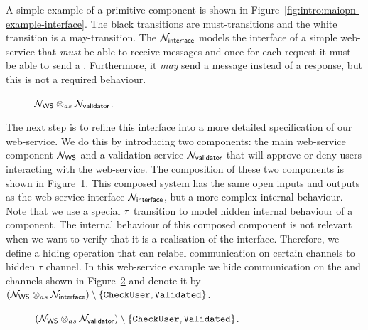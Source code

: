 A simple example of a primitive \MAIOPN component is shown in Figure~\ref{fig:intro:maiopn-example-interface}. The black transitions are must-transitions and the white transition is a may-transition. The \MAIOPN $\mathcal{N}_{\mathsf{interface}}$ models the interface of a simple web-service that \emph{must} be able to receive  messages and once for each request it must be able to send a . Furthermore, it \emph{may} send a  message instead of a response, but this is not a required behaviour. 

\begin{figure}[ht]
\centering
    
    \caption{$\mathcal{N}_{\mathsf{WS}} \otimes_{as} \mathcal{N}_{\mathsf{validator}} $.\label{fig:intro:maiopn-example-ws-composed}}
\end{figure}

The next step is to refine this interface into a more detailed specification of our web-service. We do this by introducing two components: the main web-service component $\mathcal{N}_{\mathsf{WS}}$ and a validation service $\mathcal{N}_{\mathsf{validator}}$ that will approve or deny users interacting with the web-service. The composition of these two components is shown in Figure~\ref{fig:intro:maiopn-example-ws-composed}. This composed system has the same open inputs and outputs as the web-service interface $\mathcal{N}_{\mathsf{interface}}$, but a more complex internal behaviour. Note that we use a special $\mathtt{\tau}$ transition to model hidden internal behaviour of a component. 
The internal behaviour of this composed component is not relevant when we want to verify that it is a realisation of the interface. Therefore, we define a hiding operation that can relabel communication on certain channels to hidden $\tau$ channel. In this web-service example we hide communication on the  and  channels shown in Figure~\ref{fig:intro:maiopn-example-ws-composed-hiding} and denote it by $(\mathcal{N}_{\mathsf{WS}} \otimes_{as} \mathcal{N}_{\mathsf{interface}}) \setminus \{\mathtt{CheckUser}, \mathtt{Validated}\}$. 


\begin{figure}[ht]
\centering
    
    \caption{$(\mathcal{N}_{\mathsf{WS}} \otimes_{as} \mathcal{N}_{\mathsf{validator}})\setminus \{\mathtt{CheckUser}, \mathtt{Validated}\} $.\label{fig:intro:maiopn-example-ws-composed-hiding}}
\end{figure}


